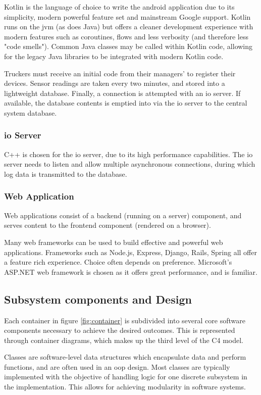 Kotlin is the language of choice to write the android application due to its simplicity, modern powerful feature set and mainstream Google support.
Kotlin runs on the \ac{jvm} (as does Java) but offers a cleaner development experience with modern features such as coroutines, flows and less verbosity (and therefore less "code smells").
Common Java classes may be called within Kotlin code, allowing for the legacy Java libraries to be integrated with modern Kotlin code.

Truckers must receive an initial code from their managers' to register their devices.
Sensor readings are taken every two minutes, and stored into a lightweight database.
Finally, a connection is attempted with an \ac{io} server. If available, the database contents is emptied into via the \ac{io} server to the central system database.

\subsubsection{\Ac{io} Server}
C++ is chosen for the \ac{io} server, due to its high performance capabilities.
The \ac{io} server needs to listen and allow multiple asynchronous connections, during which log data is transmitted to the database.

\subsubsection{Web Application}
Web applications consist of a backend (running on a server) component, and serves content to the frontend component (rendered on a browser).

Many web frameworks can be used to build effective and powerful web applications.
Frameworks such as Node.js, Express, Django, Rails, Spring all offer a feature rich experience.
Choice often depends on preference.
Microsoft's ASP.NET web framework is chosen as it offers great performance, and is familiar.

\subsection{Subsystem components and Design}
Each container in figure \ref{fig:container} is subdivided into several core software components necessary to achieve the desired outcomes.
This is represented through container diagrams, which makes up the third level of the C4 model.

Classes are software-level data structures which encapsulate data and perform functions, and are often used in an \ac{oop} design.
Most classes are typically implemented with the objective of handling logic for one discrete subsystem in the implementation.
This allows for achieving modularity in software systems.

